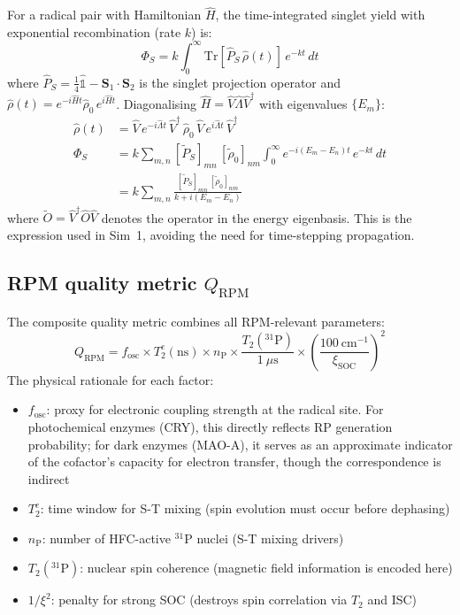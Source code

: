 \documentclass[11pt]{article}
\begin{document}
For a radical pair with Hamiltonian $\hat{H}$, the time-integrated singlet yield with exponential recombination (rate $k$) is\cite{Haberkorn1976}:
\begin{equation}
\Phi_S = k\int_0^\infty \mathrm{Tr}[\hat{P}_S\,\hat{\rho}(t)]\,e^{-kt}\,dt
\end{equation}
where $\hat{P}_S = \frac{1}{4}\hat{\mathbb{1}} - \mathbf{S}_1 \cdot \mathbf{S}_2$ is the singlet projection operator and $\hat{\rho}(t) = e^{-i\hat{H}t}\hat{\rho}_0\,e^{i\hat{H}t}$. Diagonalising $\hat{H} = \hat{V}\hat{\Lambda}\hat{V}^\dagger$ with eigenvalues $\{E_m\}$:
\begin{align}
\hat{\rho}(t) &= \hat{V}\,e^{-i\hat{\Lambda}t}\,\hat{V}^\dagger\,\hat{\rho}_0\,\hat{V}\,e^{i\hat{\Lambda}t}\,\hat{V}^\dagger \\
\Phi_S &= k\sum_{m,n} [\tilde{P}_S]_{mn}\,[\tilde{\rho}_0]_{nm} \int_0^\infty e^{-i(E_m-E_n)t}\,e^{-kt}\,dt \\
&= k\sum_{m,n} \frac{[\tilde{P}_S]_{mn}\,[\tilde{\rho}_0]_{nm}}{k + i(E_m - E_n)} \label{eq:SPhiS}
\end{align}
where $\tilde{O} = \hat{V}^\dagger\hat{O}\hat{V}$ denotes the operator in the energy eigenbasis. This is the expression used in Sim~1, avoiding the need for time-stepping propagation.

\subsection{RPM quality metric $Q_\mathrm{RPM}$}

The composite quality metric combines all RPM-relevant parameters:
\begin{equation}
Q_\mathrm{RPM} = f_\mathrm{osc} \times T_2^e(\mathrm{ns}) \times n_\mathrm{P} \times \frac{T_2(^{31}\mathrm{P})}{1~\mu\mathrm{s}} \times \left(\frac{100~\mathrm{cm}^{-1}}{\xi_\mathrm{SOC}}\right)^2
\label{eq:SQ}
\end{equation}
The physical rationale for each factor:
\begin{itemize}
\item $f_\mathrm{osc}$: proxy for electronic coupling strength at the radical site. For photochemical enzymes (CRY), this directly reflects RP generation probability; for dark enzymes (MAO-A), it serves as an approximate indicator of the cofactor's capacity for electron transfer, though the correspondence is indirect
\item $T_2^e$: time window for S-T mixing (spin evolution must occur before dephasing)
\item $n_\mathrm{P}$: number of HFC-active $^{31}$P nuclei (S-T mixing drivers)
\item $T_2(^{31}\mathrm{P})$: nuclear spin coherence (magnetic field information is encoded here)
\item $1/\xi^2$: penalty for strong SOC (destroys spin correlation via $T_2$ and ISC)
\end{itemize}
\end{document}

